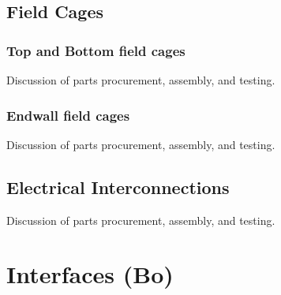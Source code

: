 \subsection{Field Cages}

%

\subsubsection{Top and Bottom field cages}
Discussion of parts procurement, assembly, and testing.

\subsubsection{Endwall field cages}
Discussion of parts procurement, assembly, and testing.


\subsection{Electrical Interconnections}

Discussion of parts procurement, assembly, and testing.



\section{Interfaces (Bo)}
\label{sec:fdsp-hv-intfc}
%
%
%
%
%
%
%
%
%
%
%
%
